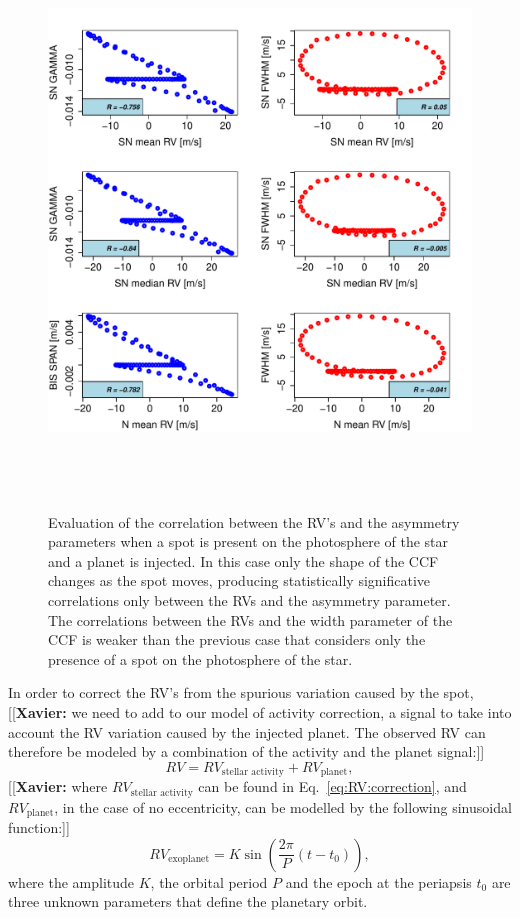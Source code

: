 \documentclass{aa}
\newcommand{\xavier}[1]{{\color{blue}[[\textbf{Xavier: }#1]]}}
\begin{document}
\begin{figure}[htbp]
   \centering
\includegraphics[height = 6in]{SOAP_SPOT_PLANET_Comparison_para_SN.pdf} 
   \caption{Evaluation of the correlation between the RV's and the asymmetry parameters when a spot is present on the photosphere of the star and a planet is injected.  In this case only the shape of the CCF changes as the spot moves, producing statistically significative correlations only between the RVs and the asymmetry parameter. The correlations between the RVs and the width parameter of the CCF is weaker than the previous case that considers only the presence of a spot on the photosphere of the star.}
    \label{fig:spot.plus.planet.corr}
\end{figure}

In order to correct the RV's from the spurious variation caused by the spot, \xavier{we need to add to our model of activity correction, a signal to take into account the RV variation caused by the injected planet. The observed RV can therefore be modeled by a combination of the activity and the planet signal:}
%
\begin{equation}
RV= RV_{\text{stellar activity}} + RV_{\text{planet}},
\label{eq:RV:correction.overall}
\end{equation}
%
\xavier{where $RV_{\text{stellar activity}}$ can be found in Eq.~\ref{eq:RV:correction}, and $RV_{\text{planet}}$, in the case of no eccentricity, can be modelled by the following sinusoidal function:}
%
\begin{equation}
RV_{\text{exoplanet}}= K \sin \left(\frac{2 \pi}{P} (t - t_{0})\right),
\label{eq:RV:correction.planet}
\end{equation}
%
where the amplitude $K$, the orbital period $P$ and the epoch at the periapsis $t_{0}$ are three unknown parameters that define the planetary orbit.
\end{document}
